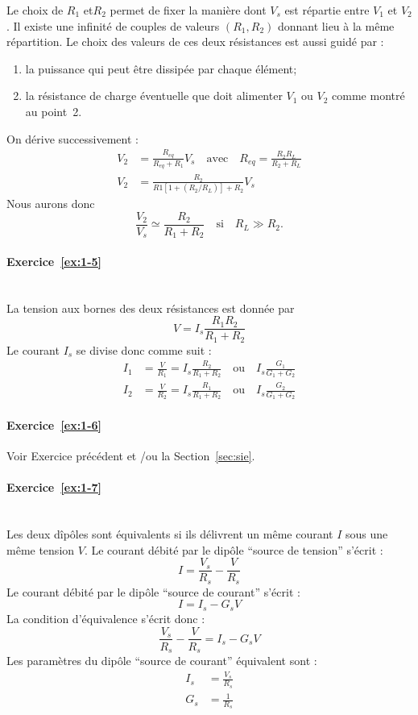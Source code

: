 Le choix de $R_1$ et$R_2$ permet de fixer la manière dont $V_s$ est
répartie entre $V_1$ et $V_2$. Il existe une infinité de couples de valeurs $(R_1,R_2)$
donnant lieu à la même répartition. Le choix des valeurs de ces deux
résistances est aussi guidé par :
\begin{enumerate}
	\item la puissance qui peut être dissipée par chaque élément;
	\item la résistance de charge éventuelle que doit alimenter $V_1$ ou
	$V_2$ comme montré au point~2.
\end{enumerate}
On dérive successivement :
\begin{align*}
V_2&=\frac{R_{eq}}{R_{eq}+R_1}V_s \quad \text{avec} \quad 
R_{eq}=\frac{R_2 R_L}{R_2 + R_L}\\
V_2 &= \frac{R_2}{R1[1+ (R_2/R_L)]+R_2}V_s
\end{align*}
Nous aurons donc 
\[\frac{V_2}{V_s}\simeq \frac{R_2}{R_1+R_2} \quad \text{si} \quad R_L \gg R_2.\]

\paragraph{Exercice~\ref{ex:1-5}}~\\%
La tension aux bornes des deux résistances est donnée par 
\[V=I_s\frac{R_1 R_2}{R_1+R_2}\]
Le courant $I_s$ se divise donc comme suit :
\begin{align*}
I_1 &=\frac{V}{R_1}=I_s\frac{R_2}{R_1+R_2} \quad \text{ou} \quad
I_s\frac{G_1}{G_1+G_2}\\
I_2 &=\frac{V}{R_2}=I_s\frac{R_1}{R_1+R_2} \quad \text{ou} \quad
I_s\frac{G_2}{G_1+G_2}
\end{align*}

\paragraph{Exercice~\ref{ex:1-6}}
Voir Exercice précédent et /ou la Section~\ref{sec:sie}.

\paragraph{Exercice~\ref{ex:1-7}}~\\%
Les deux dîpôles sont équivalents si ils délivrent un même courant $I$
sous une même tension $V$.
Le courant débité par le dipôle ``source de tension'' s'écrit :
	\[I= \frac{V_s}{R_s}-\frac{V}{R_s}\]
Le courant débité par le dipôle ``source de courant'' s'écrit :
	\[I=I_s-G_s V\]
La condition d'équivalence s'écrit donc :
\[\frac{V_s}{R_s}-\frac{V}{R_s}=I_s-G_s V\]
Les paramètres du dipôle ``source de courant'' équivalent sont :
\begin{align*}
I_s&=\frac{V_s}{R_s}\\
G_s&=\frac{1}{R_s}
\end{align*}

